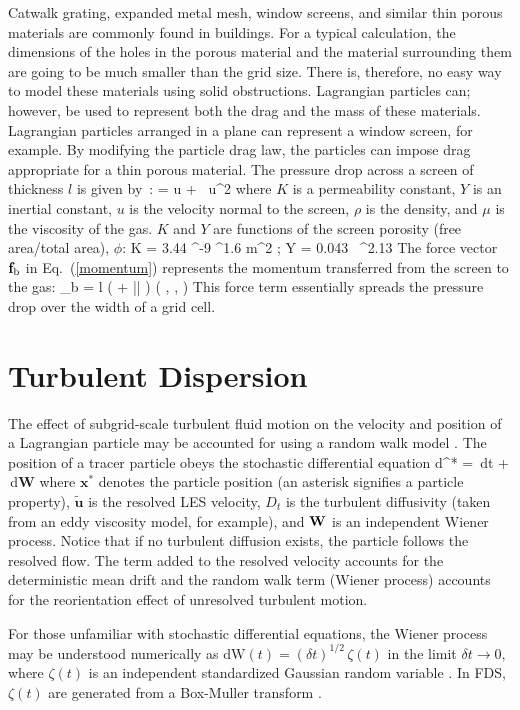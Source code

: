 Catwalk grating, expanded metal mesh, window screens, and similar thin porous materials are commonly found in buildings.  For a typical calculation, the dimensions of the holes in the porous material and the material surrounding them are going to be much smaller than the grid size.  There is, therefore, no easy way to model these materials using solid obstructions. Lagrangian particles can; however, be used to represent both the drag and the mass of these materials. Lagrangian particles arranged in a plane can represent a window screen, for example. By modifying the particle drag law, the particles can impose drag appropriate for a thin porous material.  The pressure drop across a screen of thickness $l$ is given by~\cite{Bartzanas:1}:
\be
    =   u + \rho {} \, u^2
\ee
where $K$ is a permeability constant, $Y$ is an inertial constant, $u$ is the velocity normal to the screen, $\rho$ is the density, and $\mu$ is the viscosity of the gas.  $K$ and $Y$ are functions of the screen porosity (free area/total area), $\phi$:
\be
   K = 3.44 ^{-9} \; \phi^{1.6} \; \; \hbox{m}^2 \quad ; \quad Y = 0.043 \, \phi^{2.13}
\ee
The force vector ${\mathbf{f}}_{\rm b}$ in Eq.~(\ref{momentum}) represents the momentum transferred from the screen to the gas:
\be
   \bof_{\rm b} = l \; \left(  + \rho {} |\bu| \right) \left(  ,  ,  \right)
\ee
This force term essentially spreads the pressure drop over the width of a grid cell.




\section{Turbulent Dispersion}

The effect of subgrid-scale turbulent fluid motion on the velocity and position of a Lagrangian particle may be accounted for using a random walk model \cite{Raman:CF}.  The position of a tracer particle obeys the stochastic differential equation
\be
\mbox{d}^* =  \,\mbox{d}t +  \,\mbox{d}\mbox{\textbf{W}}
\ee
where $\mathbf{x}^*$ denotes the particle position (an asterisk signifies a particle property), $\tilde{\mathbf{u}}$ is the resolved LES velocity, $D_t$ is the turbulent diffusivity (taken from an eddy viscosity model, for example), and $\mbox{\textbf{W}}$ is an independent Wiener process.  Notice that if no turbulent diffusion exists, the particle follows the resolved flow.  The term added to the resolved velocity accounts for the deterministic mean drift and the random walk term (Wiener process) accounts for the reorientation effect of unresolved turbulent motion.

For those unfamiliar with stochastic differential equations, the Wiener process may be understood numerically as $\mbox{dW}(t) = (\delta t)^{1/2} \, \zeta(t)$ in the limit $\delta t \rightarrow 0$, where $\zeta(t)$ is an independent standardized Gaussian random variable \cite{Pope:2000}.  In FDS, $\zeta(t)$ are generated from a Box-Muller transform \cite{Box-Muller:1958}.
